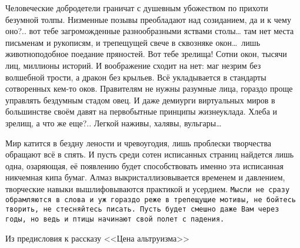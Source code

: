 Человеческие добродетели граничат с душевным убожеством по прихоти безумной 
толпы. Низменные позывы преобладают над созиданием, да и к чему оно?.. вот тебе 
загроможденные разнообразными яствами столы… там нет места письменам и 
рукописям, и трепещущей свече в сквозняке окон\dots\ лишь животноподобное 
поедание пряностей. Вот тебе зрелища! Сотни окон, тысячи лиц, миллионы 
историй. И воображение сходит на нет: маг незрим без волшебной трости, а 
дракон без крыльев. Всё укладывается в стандарты сотворенных кем-то оков. 
Правителям не нужны разумные лица, гораздо проще управлять бездумным стадом 
овец. И даже демиурги виртуальных миров в большинстве своём давят на первобытные 
принципы жизнеуклада. Хлеба и зрелищ, а что же еще?.. Легкой наживы, 
халявы, вульгары\dots

\vspace{8mm}
Мир катится в бездну лености и чревоугодия, лишь проблески творчества обращают 
всё в спять. И пусть среди сотен исписанных страниц найдется лишь одна, 
озаряющая, её появлению будет способствовать именно эта исписанная никчемная 
кипа бумаг. Алмаз выкристаллизовывается временем и давлением, творческие навыки 
вышлифовываются практикой и усердием. \texttt{Мысли не сразу обрамляются в слова 
и уж гораздо реже в трепещущие мотивы, не бойтесь творить, не стесняйтесь 
писать. Пусть будет смешно даже Вам через годы, но ведь и птицы начинают свой 
полет с падения.}

\vspace{24mm}
\noindent Из предисловия к рассказу <<Цена альтруизма>>\\
\noindent {}